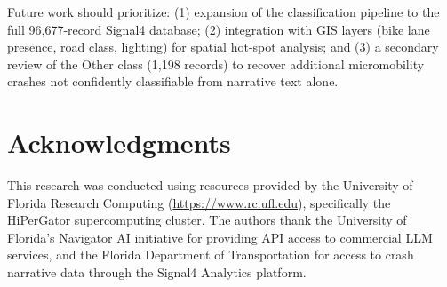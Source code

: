 \documentclass[numbered]{trbunofficial}
\begin{document}
Future work should prioritize: (1) expansion of the classification pipeline to the full 96,677-record Signal4 database; (2) integration with GIS layers (bike lane presence, road class, lighting) for spatial hot-spot analysis; and (3) a secondary review of the Other class (1,198 records) to recover additional micromobility crashes not confidently classifiable from narrative text alone.

\section{Acknowledgments}
This research was conducted using resources provided by the University of Florida Research Computing (\url{https://www.rc.ufl.edu}), specifically the HiPerGator supercomputing cluster. The authors thank the University of Florida's Navigator AI initiative for providing API access to commercial LLM services, and the Florida Department of Transportation for access to crash narrative data through the Signal4 Analytics platform.




\end{document}
